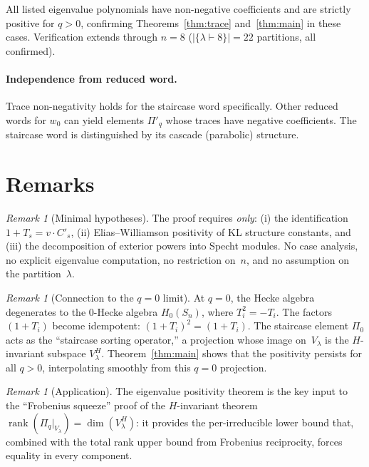 \documentclass[11pt]{article}
\theoremstyle{definition}
\theoremstyle{remark}
\newtheorem{remark}[theorem]{Remark}
\begin{document}
\noindent
All listed eigenvalue polynomials have non-negative coefficients
and are strictly positive for $q > 0$, confirming
Theorems~\ref{thm:trace} and~\ref{thm:main} in these cases.
Verification extends through $n = 8$ ($|\{\lambda \vdash 8\}| = 22$
partitions, all confirmed).

\paragraph{Independence from reduced word.}
Trace non-negativity holds for the staircase word specifically.
Other reduced words for $w_0$ can yield elements $\Pi'_q$ whose
traces have negative coefficients.  The staircase word is
distinguished by its cascade (parabolic) structure.

\section{Remarks}

\begin{remark}[Minimal hypotheses]
The proof requires \emph{only}:
(i) the identification $1 + T_s = v \cdot C'_s$,
(ii) Elias--Williamson positivity of KL structure constants, and
(iii) the decomposition of exterior powers into Specht modules.
No case analysis, no explicit eigenvalue computation, no restriction
on~$n$, and no assumption on the partition~$\lambda$.
\end{remark}

\begin{remark}[Connection to the $q = 0$ limit]
At $q = 0$, the Hecke algebra degenerates to the $0$-Hecke algebra
$H_0(S_n)$, where $T_i^2 = -T_i$.  The factors $(1 + T_i)$ become
idempotent: $(1 + T_i)^2 = (1 + T_i)$.  The staircase element
$\Pi_0$ acts as the ``staircase sorting operator,'' a projection
whose image on~$V_\lambda$ is the $H$-invariant subspace
$V_\lambda^H$.  Theorem~\ref{thm:main} shows that the positivity
persists for all $q > 0$, interpolating smoothly from this $q = 0$
projection.
\end{remark}

\begin{remark}[Application]
The eigenvalue positivity theorem is the key input to the
``Frobenius squeeze'' proof of the $H$-invariant theorem
$\operatorname{rank}(\Pi_q|_{V_\lambda}) = \dim(V_\lambda^H)$:
it provides the per-irreducible lower bound that, combined with
the total rank upper bound from Frobenius reciprocity, forces
equality in every component.
\end{remark}
\end{document}

